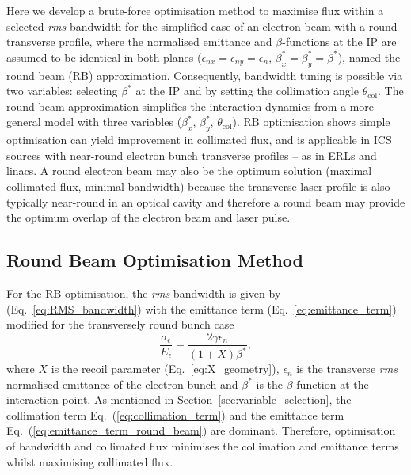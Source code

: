 \documentclass[../main.tex]{subfiles}
\begin{document}
Here we develop a brute-force optimisation method to maximise flux within a selected \textit{rms} bandwidth for the simplified case of an electron beam with a round transverse profile, where the normalised emittance and $\beta$-functions at the IP are assumed to be identical in both planes ($\epsilon_{nx} = \epsilon_{ny} = \epsilon_{n}$, $\beta_{x}^{*} = \beta_{y}^{*} = \beta^{*}$), named the round beam (RB) approximation. Consequently, bandwidth tuning is possible via two variables: selecting $\beta^{*}$ at the IP and by setting the collimation angle $\theta_{\mathrm{col}}$.  The round beam approximation simplifies the interaction dynamics from a more general model with three variables ($\beta_{x}^{*}$, $\beta_{y}^{*}$, $\theta_{\mathrm{col}}$). RB optimisation shows simple optimisation can yield improvement in collimated flux, and is applicable in ICS sources with near-round electron bunch transverse profiles -- as in ERLs and linacs. A round electron beam may also be the optimum solution (maximal collimated flux, minimal bandwidth) because the transverse laser profile is also typically near-round in an optical cavity \cite{dupraz2020thomx} and therefore a round beam may provide the optimum overlap of the electron beam and laser pulse.

\subsection{Round Beam Optimisation Method}

For the RB optimisation, the \textit{rms} bandwidth is given by (Eq.~\ref{eq:RMS_bandwidth}) with the emittance term (Eq.~\ref{eq:emittance_term}) modified for the transversely round bunch case
\begin{equation}
\frac{\sigma_{\epsilon}}{E_{\epsilon}} = \frac{2\gamma\epsilon_{n}}{\left(1+X\right)\beta^{*}},
\label{eq:emittance_term_round_beam}    
\end{equation}
where $X$ is the recoil parameter (Eq.~\ref{eq:X_geometry}), $\epsilon_{n}$ is the transverse \textit{rms} normalised emittance of the electron bunch and $\beta^{*}$ is the $\beta$-function at the interaction point. As mentioned in Section~\ref{sec:variable_selection}, the collimation term Eq.~(\ref{eq:collimation_term}) and the emittance term Eq.~(\ref{eq:emittance_term_round_beam}) are dominant. Therefore, optimisation of bandwidth and collimated flux minimises the collimation and emittance terms whilst maximising collimated flux.
\end{document}
